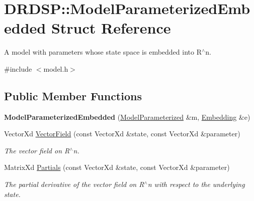 \hypertarget{struct_d_r_d_s_p_1_1_model_parameterized_embedded}{\section{D\-R\-D\-S\-P\-:\-:Model\-Parameterized\-Embedded Struct Reference}
\label{struct_d_r_d_s_p_1_1_model_parameterized_embedded}
}


A model with parameters whose state space is embedded into R$^\wedge$n.  




{\ttfamily \#include $<$model.\-h$>$}

\subsection*{Public Member Functions}
\begin{DoxyCompactItemize}
\item 
\hypertarget{struct_d_r_d_s_p_1_1_model_parameterized_embedded_a3a8a9503f4175ab7c015912661a93fad}{{\bfseries Model\-Parameterized\-Embedded} (\hyperlink{struct_d_r_d_s_p_1_1_model_parameterized}{Model\-Parameterized} \&m, \hyperlink{struct_d_r_d_s_p_1_1_embedding}{Embedding} \&e)}\label{struct_d_r_d_s_p_1_1_model_parameterized_embedded_a3a8a9503f4175ab7c015912661a93fad}

\item 
\hypertarget{struct_d_r_d_s_p_1_1_model_parameterized_embedded_a1b2616cdd5889d38bfcf68116aaa9355}{Vector\-Xd \hyperlink{struct_d_r_d_s_p_1_1_model_parameterized_embedded_a1b2616cdd5889d38bfcf68116aaa9355}{Vector\-Field} (const Vector\-Xd \&state, const Vector\-Xd \&parameter)}\label{struct_d_r_d_s_p_1_1_model_parameterized_embedded_a1b2616cdd5889d38bfcf68116aaa9355}

\begin{DoxyCompactList}\small\item\em The vector field on R$^\wedge$n. \end{DoxyCompactList}\item 
\hypertarget{struct_d_r_d_s_p_1_1_model_parameterized_embedded_ae7ba4d682d23057bdb6d09b1b0005f33}{Matrix\-Xd \hyperlink{struct_d_r_d_s_p_1_1_model_parameterized_embedded_ae7ba4d682d23057bdb6d09b1b0005f33}{Partials} (const Vector\-Xd \&state, const Vector\-Xd \&parameter)}\label{struct_d_r_d_s_p_1_1_model_parameterized_embedded_ae7ba4d682d23057bdb6d09b1b0005f33}

\begin{DoxyCompactList}\small\item\em The partial derivative of the vector field on R$^\wedge$n with respect to the underlying state. \end{DoxyCompactList}\end{DoxyCompactItemize}
